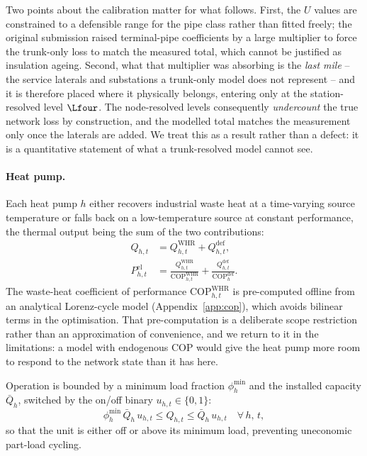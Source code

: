 Two points about the calibration matter for what follows. First, the $U$ values are
constrained to a defensible range for the pipe class rather than fitted freely; the
original submission raised terminal-pipe coefficients by a large multiplier to force the
trunk-only loss to match the measured total, which cannot be justified as insulation
ageing. Second, what that multiplier was absorbing is the \emph{last mile} -- the service
laterals and substations a trunk-only model does not represent -- and it is therefore
placed where it physically belongs, entering only at the station-resolved level $\Lfour$.
The node-resolved levels consequently \emph{undercount} the true network loss by
construction, and the modelled total matches the measurement only once the laterals are
added. We treat this as a result rather than a defect: it is a quantitative statement of
what a trunk-resolved model cannot see.

\paragraph{Heat pump.}
Each heat pump $h$ either recovers industrial waste heat at a time-varying source
temperature or falls back on a low-temperature source at constant performance, the
thermal output being the sum of the two contributions:
%
\begin{align}
  Q_{h,t} &= Q_{h,t}^{\mathrm{WHR}} + Q_{h,t}^{\mathrm{def}},
  \label{eq:hp_split} \\[4pt]
  P_{h,t}^{\mathrm{el}} &= \frac{Q_{h,t}^{\mathrm{WHR}}}{
    \mathrm{COP}_{h,t}^{\mathrm{WHR}}}
    + \frac{Q_{h,t}^{\mathrm{def}}}{\mathrm{COP}_h^{\mathrm{def}}}.
  \label{eq:hp_pel}
\end{align}
%
The waste-heat coefficient of performance $\mathrm{COP}_{h,t}^{\mathrm{WHR}}$ is
pre-computed offline from an analytical Lorenz-cycle model
(Appendix~\ref{app:cop}), which avoids bilinear terms in the optimisation. That
pre-computation is a deliberate scope restriction rather than an approximation of
convenience, and we return to it in the limitations: a model with endogenous COP would
give the heat pump more room to respond to the network state than it has here.

Operation is bounded by a minimum load fraction $\phi_h^{\mathrm{min}}$ and the installed
capacity $\bar{Q}_h$, switched by the on/off binary $u_{h,t} \in \{0,1\}$:
%
\begin{equation}
  \phi_h^{\mathrm{min}}\, \bar{Q}_h\, u_{h,t}
  \leq Q_{h,t} \leq \bar{Q}_h\, u_{h,t}
  \quad \forall\, h,\, t,
  \label{eq:hp_cap}
\end{equation}
%
so that the unit is either off or above its minimum load, preventing uneconomic part-load
cycling.

